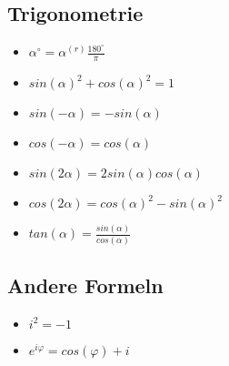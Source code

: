 \subsection{Trigonometrie}
\begin{itemize}
	\item $\alpha^\circ = \alpha^{(r)} \frac{180^\circ}{\pi}$
	\item $sin(\alpha)^2 + cos(\alpha)^2 = 1$
	\item $sin(-\alpha) = - sin(\alpha)$
	\item $cos(-\alpha) = cos(\alpha)$
	\item $sin(2\alpha) = 2 sin(\alpha) cos(\alpha)$
	\item $cos(2\alpha) = cos(\alpha)^2 - sin(\alpha)^2$
	\item $tan(\alpha) = \frac{sin(\alpha)}{cos(\alpha)}$
\end{itemize}

\subsection{Andere Formeln}
\begin{itemize}
    \item $i^2 = -1$
    \item $e^{i\varphi} = cos(\varphi) + i$
\end{itemize}
